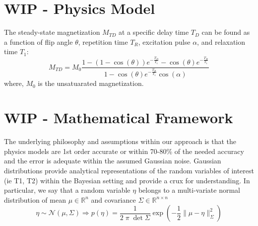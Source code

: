 \documentclass{article}         %
\theoremstyle{definition}
\theoremstyle{remark}
\begin{document}
 


\section{ WIP - Physics Model}\label{PhysicsModel}
The steady-state magnetization $M_{TD}$ at a specific delay time $T_D$ can be found as a function of flip angle $\theta$, repetition time $T_R$, excitation pulse $\alpha$, and relaxation time  $T_1$:
\[
  M_{TD}  =  M_0\frac{1-(1-\cos(\theta))e^{-\frac{T_D}{T_1}}-\cos(\theta)e^{-\frac{T_R}{T_1}}}{1-\cos(\theta)e^{-\frac{T_R}{T_1}}\cos(\alpha)}
\]
where, $M_0$ is the unsatuarated magnetization.
\section{ WIP - Mathematical Framework}\label{GeneralMathFramework}

The underlying philosophy and assumptions within our approach is that the physics 
models are 1st order accurate or within 70-80\% of the needed accuracy and the error is
adequate within the assumed Gaussian noise.
Gaussian distributions provide analytical representations of the random
variables of interest (ie T1, T2) within the Bayesian setting and 
provide a crux for understanding. In particular, we say that a random
variable $\eta$ belongs to a multi-variate normal distribution 
of mean $\mu \in \mathbb{R}^n $ and covariance $\Sigma \in \mathbb{R}^{n \times n}$
\[
     \eta \sim \mathcal{N}(\mu,\Sigma)  
    \Rightarrow
      p(\eta)  = \frac{1}{2 \; \pi \; \det{\Sigma}} \exp\left( - \frac{1}{2} \| \mu - \eta\|^2_{\Sigma}\right)
\]
\end{document}
